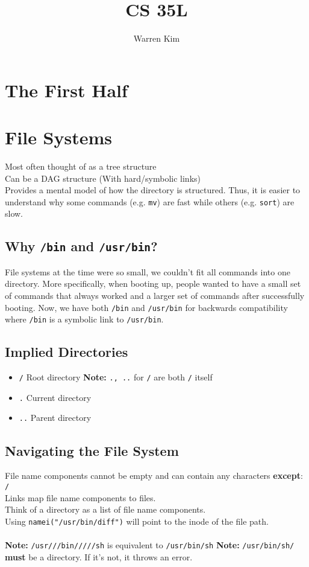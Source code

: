 \documentclass[13pt]{article}
\begin{document}
\title{CS 35L}
\author{Warren Kim}
\date{}
\maketitle
\tableofcontents
\newpage
{}
\section*{The First Half}
\section{File Systems}
Most often thought of as a tree structure \\
Can be a DAG structure (With hard/symbolic links) \\
Provides a mental model of how the directory is structured. Thus, it is easier to understand why some commands (e.g. \texttt{mv}) are fast while others (e.g. \texttt{sort}) are slow.

\subsection{Why \texttt{/bin} and \texttt{/usr/bin}?}
File systems at the time were so small, we couldn't fit all commands into one directory. More specifically, when booting up, people wanted to have a small set of commands that always worked and a larger set of commands after successfully booting. Now, we have both \texttt{/bin} and \texttt{/usr/bin} for backwards compatibility where \texttt{/bin} is a symbolic link to \texttt{/usr/bin}.

\subsection{Implied Directories}
\begin{itemize}[leftmargin = 0pt]
\item [] \texttt{/} Root directory
  \subitem \textbf{Note:} \texttt{., ..} for \texttt{/} are both \texttt{/} itself
\item [] \texttt{.} Current directory
\item [] \texttt{..} Parent directory
\end{itemize}

\subsection{Navigating the File System}
File name components cannot be empty and can contain any characters \textbf{except}: \texttt{/} \\
Links map file name components to files. \\
Think of a directory as a list of file name components. \\
Using \texttt{namei("/usr/bin/diff")} will point to the inode of the file path. \\ \\
\textbf{Note:} \texttt{/usr///bin/////sh} is equivalent to \texttt{/usr/bin/sh}
\textbf{Note:} \texttt{/usr/bin/sh/} \textbf{must} be a directory. If it's not, it throws an error.
\end{document}
